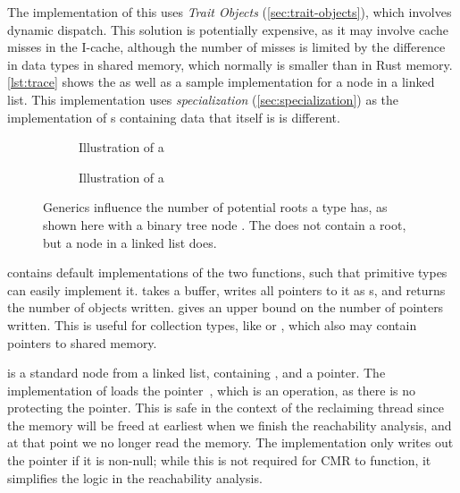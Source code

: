 The implementation of this uses \emph{Trait Objects} (\cref{sec:trait-objects}), which involves
dynamic dispatch. This solution is potentially expensive, as it may involve cache misses in the
I-cache, although the number of misses is limited by the difference in data types in shared memory,
which normally is smaller than in Rust memory. \cref{lst:trace} shows the  as well as a
sample implementation for a node in a linked list.  This implementation uses \emph{specialization}
(\cref{sec:specialization}) as the implementation of s containing data that itself is
 is different.

\begin{figure}[ht]
  \begin{subfigure}{0.5\textwidth}
    
    \caption{Illustration of a }
  \end{subfigure}
  \begin{subfigure}{0.5\textwidth}
    
    \caption{Illustration of a }
  \end{subfigure}
  \caption{Generics influence the number of potential roots a type has, as shown here with a binary
  tree node . The  does not contain a root, but a node in a linked
  list  does.}
\end{figure}

\begin{figure}[ht]
  
\end{figure}


 contains default implementations of the two functions, such that primitive types can
easily implement it.  takes a buffer, writes all pointers to it as s,
and returns the number of objects written.  gives an upper bound on the number of
pointers written. This is useful for collection types, like  or , which
also may contain pointers to shared memory.

 is a standard node from a linked list, containing , and a 
pointer. The implementation of  loads the  pointer~, which is
an  operation, as there is no  protecting the pointer. This is safe in the
context of the reclaiming thread since the memory will be freed at earliest when we finish the reachability
analysis, and at that point we no longer read the memory. The implementation only writes out the
pointer if it is non-null; while this is not required for CMR to function, it simplifies the logic
in the reachability analysis.


